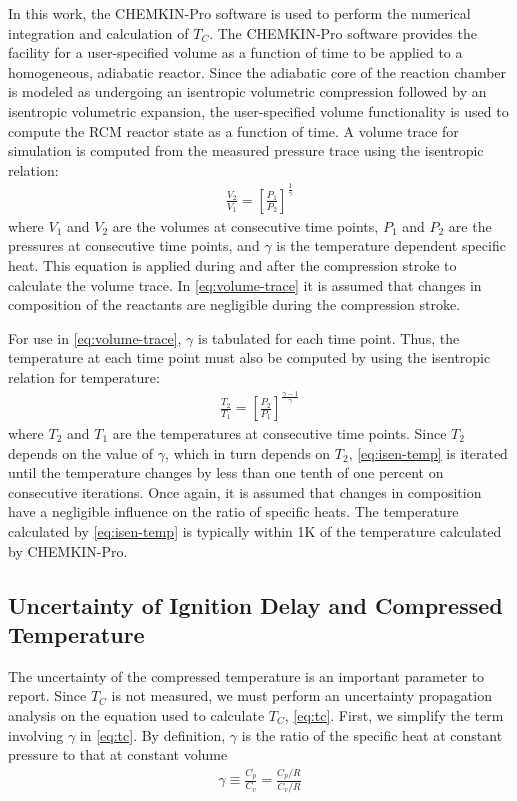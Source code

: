 \documentclass[../main.tex]{subfiles}
\begin{document}
In this work, the CHEMKIN-Pro \cite{Chemkin2012} software is used to
perform the numerical integration and calculation of $T_C$. The
CHEMKIN-Pro software provides the facility for a user-specified
volume as a function of time to be applied to a homogeneous,
adiabatic reactor. Since the adiabatic core of the reaction chamber
is modeled as undergoing an isentropic volumetric compression followed
by an isentropic volumetric expansion, the user-specified volume
functionality is used to compute the RCM reactor state as a function
of time. A volume trace for simulation is computed from the measured
pressure trace using the isentropic relation:
%
\begin{align}
\frac{V_2}{V_1} = \left[\frac{P_1}{P_2}\right]^{\frac{1}{\gamma}}
\label{eq:volume-trace}
\end{align}
%
where $V_1$ and $V_2$ are the volumes at consecutive time points,
$P_1$ and $P_2$ are the pressures at consecutive time points, and
$\gamma$ is the temperature dependent specific heat. This equation
is applied during and after the compression stroke to calculate
the volume trace. In \autoref{eq:volume-trace} it is assumed that
changes in composition of the reactants are negligible during the
compression stroke.

For use in \autoref{eq:volume-trace}, $\gamma$ is tabulated for each
time point. Thus, the temperature at each time point must also be
computed by using the isentropic relation for temperature:
%
\begin{align}
\frac{T_2}{T_1} = \left[\frac{P_2}{P_1}\right]^{\frac{\gamma-1}{\gamma}}
\label{eq:isen-temp}
\end{align}
%
where $T_2$ and $T_1$ are the temperatures at consecutive time points.
Since $T_2$ depends on the value of $\gamma$, which in turn depends
on $T_2$, \autoref{eq:isen-temp} is iterated until the temperature
changes by less than one tenth of one percent on consecutive iterations.
Once again, it is assumed that changes in composition have a negligible
influence on the ratio of specific heats.
The temperature calculated by \autoref{eq:isen-temp} is typically within
1K of the temperature calculated by CHEMKIN-Pro.

\subsection{Uncertainty of Ignition Delay and Compressed Temperature}
\label{sec:uncertainty}

The uncertainty of the compressed temperature is an important parameter
to report. Since $T_C$ is not measured, we must perform an uncertainty
propagation analysis on the equation used to calculate $T_C$,
\autoref{eq:tc}. First, we simplify the term involving $\gamma$ in
\autoref{eq:tc}. By definition, $\gamma$ is the ratio of the specific heat
at constant pressure to that at constant volume
%
\begin{align}
\gamma \equiv \frac{C_p}{C_v} = \frac{C_p/R}{C_v/R}
\end{align}
\end{document}
